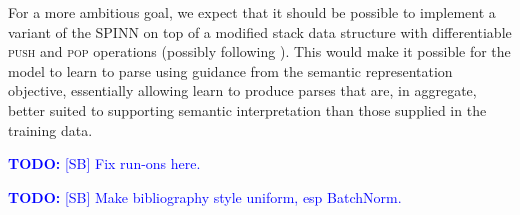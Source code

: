 \documentclass[11pt]{article}
\newcommand\todo[1]{\textcolor{blue}{\textbf{TODO:} #1}}
\begin{document}
For a more ambitious goal, we expect that it should be possible to implement a variant of the SPINN on top of a modified stack data structure with differentiable \textsc{push} and \textsc{pop} operations (possibly following \citet{grefenstette2015learning,joulin2015inferring}). This would make it possible for the model to learn to parse using guidance from the semantic representation objective, essentially allowing learn to produce parses that are, in aggregate, better suited to supporting semantic interpretation than those supplied in the training data. 

\todo{[SB] Fix run-ons here.}

%    
 


\todo{[SB] Make bibliography style uniform, esp BatchNorm.}
\end{document}
